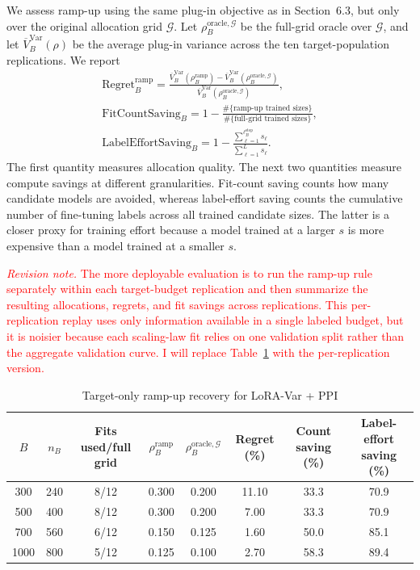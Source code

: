 \documentclass[11pt]{article}
\begin{document}
We assess ramp-up using the same plug-in objective as in Section~6.3, but only over the original
allocation grid $\mathcal{G}$. Let $\rho_B^{\mathrm{oracle},\mathcal{G}}$ be the full-grid oracle
over $\mathcal{G}$, and let $\overline V_B^{\mathrm{Var}}(\rho)$ be the average plug-in variance
across the ten target-population replications. We report
\[
\begin{aligned}
    \mathrm{Regret}_B^{\mathrm{ramp}}
    =
    \frac{
        \overline V_B^{\mathrm{Var}}(\rho_B^{\mathrm{ramp}})
        -
        \overline V_B^{\mathrm{Var}}(\rho_B^{\mathrm{oracle},\mathcal{G}})
    }{
        \overline V_B^{\mathrm{Var}}(\rho_B^{\mathrm{oracle},\mathcal{G}})
    },\\[0.4em]
    \mathrm{FitCountSaving}_B
    =
    1-
    \frac{\#\{\text{ramp-up trained sizes}\}}
         {\#\{\text{full-grid trained sizes}\}},\\[0.4em]
    \mathrm{LabelEffortSaving}_B
    =
    1-
    \frac{\sum_{\ell=1}^{\ell_B^{\mathrm{stop}}} s_\ell}
         {\sum_{\ell=1}^{L} s_\ell} .
\end{aligned}
\]
The first quantity measures allocation quality. The next two quantities measure compute savings at
different granularities. Fit-count saving counts how many candidate models are avoided, whereas
label-effort saving counts the cumulative number of fine-tuning labels across all trained
candidate sizes. The latter is a closer proxy for training effort because a model trained at a
larger $s$ is more expensive than a model trained at a smaller $s$.

\textcolor{red}{\emph{Revision note.} The more deployable evaluation is to run the ramp-up rule
separately within each target-budget replication and then summarize the resulting allocations,
regrets, and fit savings across replications. This per-replication replay uses only information
available in a single labeled budget, but it is noisier because each scaling-law fit relies on one
validation split rather than the aggregate validation curve. I will replace
Table~\ref{tab:rampup_recovery} with the per-replication version.}

\begin{table}[H]
\centering
\caption{Target-only ramp-up recovery for LoRA-Var + PPI}
\label{tab:rampup_recovery}
\scriptsize
\setlength{\tabcolsep}{3.7pt}
\renewcommand{\arraystretch}{1.08}
\begin{tabular}{@{}c c c c c c c c@{}}
\toprule
$B$ & $n_B$ & Fits used/full grid & $\rho_B^{\mathrm{ramp}}$ &
$\rho_B^{\mathrm{oracle},\mathcal{G}}$ & Regret (\%) & Count saving (\%) &
Label-effort saving (\%) \\
\midrule
300  & 240 & 8/12 & 0.300 & 0.200 & 11.10 & 33.3 & 70.9 \\
500  & 400 & 8/12 & 0.300 & 0.200 & 7.00  & 33.3 & 70.9 \\
700  & 560 & 6/12 & 0.150 & 0.125 & 1.60  & 50.0 & 85.1 \\
1000 & 800 & 5/12 & 0.125 & 0.100 & 2.70  & 58.3 & 89.4 \\
\bottomrule
\end{tabular}
\end{table}
\end{document}
